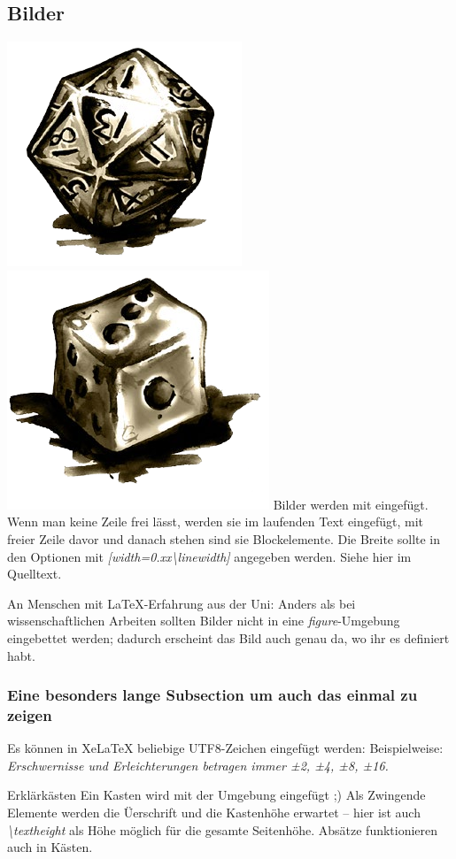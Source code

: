 \begin{multicols}{2}[        %
		]
\subsection{Bilder}
\includegraphics[width=0.5\linewidth]{würfel20.png}
\includegraphics[width=0.3\linewidth]{würfel6.png} 
%
	Bilder werden mit  eingefügt. Wenn man keine Zeile frei lässt, werden sie im laufenden Text eingefügt, mit freier Zeile davor und danach stehen sind sie Blockelemente.
	Die Breite sollte in den Optionen mit \emph{[width=0.xx\textbackslash{}linewidth]}  angegeben werden. 
	 Siehe hier im Quelltext. 

	An Menschen mit \LaTeX-Erfahrung aus der Uni:
     Anders als bei wissenschaftlichen Arbeiten sollten Bilder nicht in eine \emph{figure}-Umgebung eingebettet werden;
	 dadurch erscheint das Bild auch genau da, wo ihr es definiert habt.

\subsubsection{Eine besonders lange Subsection um auch das einmal zu zeigen}
Es können in XeLaTeX beliebige UTF8-Zeichen eingefügt werden: Beispielweise: 
	\emph{Erschwernisse und Erleichterungen betragen immer ±2, ±4, ±8, ±16.}

\begin{kasten}{4.8cm}{Erklärkästen}
	Ein Kasten wird mit der Umgebung  eingefügt ;) Als Zwingende Elemente werden die Üerschrift und die Kastenhöhe erwartet – hier ist auch \emph{\textbackslash{}textheight} als Höhe möglich für die gesamte Seitenhöhe.  
	Absätze funktionieren auch in Kästen.


\end{kasten}
\end{multicols}
